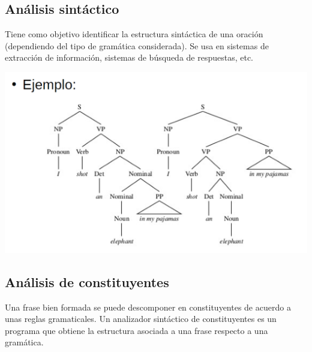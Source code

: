 \documentclass{ctexart}
\begin{document}
	\subsection{Análisis sintáctico}
	\begin{flushleft}
		Tiene como objetivo identificar la estructura sintáctica de una oración (dependiendo del tipo de gramática considerada). Se usa en sistemas de extracción de información, sistemas de búsqueda de respuestas, etc. \par 
		\includegraphics[scale=0.35]{sintac} \par
	\end{flushleft}
	\subsection{Análisis de constituyentes}
	\begin{flushleft}
		Una frase bien formada se puede descomponer en constituyentes de acuerdo a unas reglas gramaticales. Un analizador sintáctico de constituyentes es un programa que obtiene la estructura asociada a una frase respecto a una gramática. \par 
	\end{flushleft}
\end{document}
